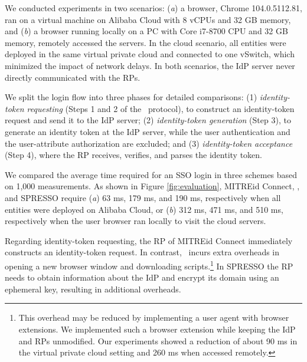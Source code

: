We conducted experiments in two scenarios: (\emph{a}) a browser, Chrome 104.0.5112.81, ran on a virtual machine on Alibaba Cloud with 8 vCPUs and 32 GB memory, and (\emph{b}) a browser running locally on a PC with Core i7-8700 CPU and 32 GB memory, remotely accessed the servers.
In the cloud scenario, all entities were deployed in the same virtual private cloud and connected to one vSwitch, which minimized the impact of network delays. In both scenarios, the IdP server never directly communicated with the RPs.

 We split the login flow into three phases for detailed comparisons: (1)
{\em identity-token requesting} (Steps 1 and 2 of the \usso\ protocol), to construct an identity-token request and send it to the IdP server; (2) {\em identity-token generation} (Step 3), to generate an identity token at the IdP server, while the user authentication and the user-attribute authorization are excluded; and (3) {\em identity-token acceptance} (Step 4), where the RP receives, verifies, and parses the identity token.


We compared the average time required for an SSO login in three schemes based on 1,000 measurements. As shown in Figure \ref{fig:evaluation},
MITREid Connect, \usso, and SPRESSO require (\emph{a}) 63 ms, 179 ms, and 190 ms, respectively when all entities were deployed on Alibaba Cloud,
 or (\emph{b}) 312 ms, 471 ms, and 510 ms, respectively when the user browser ran locally to visit the cloud servers.

Regarding identity-token requesting, %
the RP of MITREid Connect immediately constructs an identity-token request. %
In contrast, \usso\ incurs extra overheads in opening a new browser window and downloading scripts.\footnote{This overhead may be reduced %
by implementing a user agent with browser extensions.
We implemented such a browser extension while keeping the IdP and RPs unmodified. Our experiments showed a reduction of about 90 ms in the virtual private cloud setting and 260 ms when accessed remotely.}
In SPRESSO the RP needs to obtain information about the IdP %
and encrypt its domain using an ephemeral key, resulting in additional overheads.

